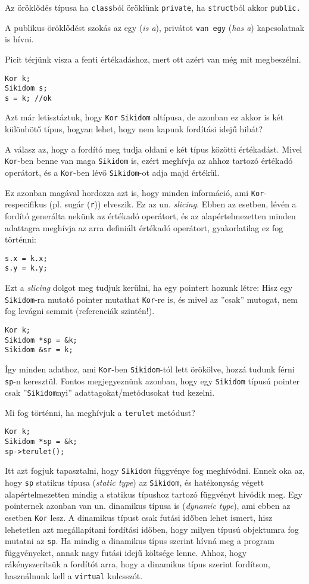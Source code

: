 \documentclass[a4paper,11.5pt]{article}
\begin{document}
	Az öröklődés típusa ha \texttt{class}ból öröklünk \texttt{private}, ha \texttt{struct}ból akkor \texttt{public.}
	\begin{note}
		A publikus öröklődést szokás {az egy} (\textit{is a}), privátot \texttt{van egy} (\textit{has a}) kapcsolatnak is hívni.
	\end{note}
	Picit térjünk visza a fenti értékadáshoz, mert ott azért van még mit megbeszélni.
	\begin{lstlisting}
Kor k;
Sikidom s;
s = k; //ok
	\end{lstlisting}
	Azt már letisztáztuk, hogy \texttt{Kor} \texttt{Sikidom} altípusa, de azonban ez akkor is két különbötő típus, hogyan lehet, hogy nem kapunk fordítási idejű hibát?
	
	A válasz az, hogy a fordító meg tudja oldani e két típus közötti értékadást. Mivel \texttt{Kor}-ben benne van maga \texttt{Sikidom} is, ezért meghívja az ahhoz tartozó értékadó operátort, és a \texttt{Kor}-ben lévő \texttt{Sikidom}-ot adja majd értékül.
	
	Ez azonban magával hordozza azt is, hogy minden információ, ami \texttt{Kor}-respecifikus (pl. sugár (\texttt{r})) elveszik. Ez az un. \textit{slicing}. Ebben az esetben, lévén a fordító generálta nekünk az értékadó operátort, és az alapértelmezetten minden adattagra meghívja az arra definiált értékadó operátort, gyakorlatilag ez fog történni:
	\begin{lstlisting}
s.x = k.x;
s.y = k.y;
	\end{lstlisting}
	
	Ezt a \textit{slicing} dolgot meg tudjuk kerülni, ha egy pointert hozunk létre: Hisz egy \texttt{Sikidom}-ra mutató pointer mutathat \texttt{Kor}-re is, és mivel az ''csak'' mutogat, nem fog levágni semmit (referenciák szintén!). 
	\begin{lstlisting}
Kor k;
Sikidom *sp = &k; 
Sikidom &sr = k;
	\end{lstlisting}
	Így minden adathoz, ami \texttt{Kor}-ben \texttt{Sikidom}-tól lett örökölve, hozzá tudunk férni \texttt{sp}-n keresztül. Fontos megjegyeznünk azonban, hogy egy \texttt{Sikidom} típusú pointer csak ''\texttt{Sikidom}nyi'' adattagokat/metódusokat tud kezelni.
	
	Mi fog történni, ha meghívjuk a \texttt{terulet} metódust?
	\begin{lstlisting}
Kor k;
Sikidom *sp = &k;
sp->terulet();
	\end{lstlisting}
	Itt azt fogjuk tapasztalni, hogy \texttt{Sikidom} függvénye fog meghívódni. Ennek oka az, hogy \texttt{sp} statikus típusa (\textit{static type}) az \texttt{Sikidom}, és hatékonyság végett alapértelmezetten mindig a statikus típushoz tartozó függvényt hívódik meg. Egy pointernek azonban van un. dinamikus típusa is (\textit{dynamic type}), ami ebben az esetben \texttt{Kor} lesz. A dinamikus típust csak futási időben lehet ismert, hisz lehetetlen azt megállapítani fordítási időben, hogy milyen típusú objektumra fog mutatni az \texttt{sp}. Ha mindig a dinamikus típus szerint hívná meg a program függvényeket, annak nagy futási idejű költsége lenne. Ahhoz, hogy rákényszerítsük a fordítót arra, hogy a dinamikus típus szerint fordítson, használnunk kell a \texttt{virtual} kulcsszót.
\end{document}
